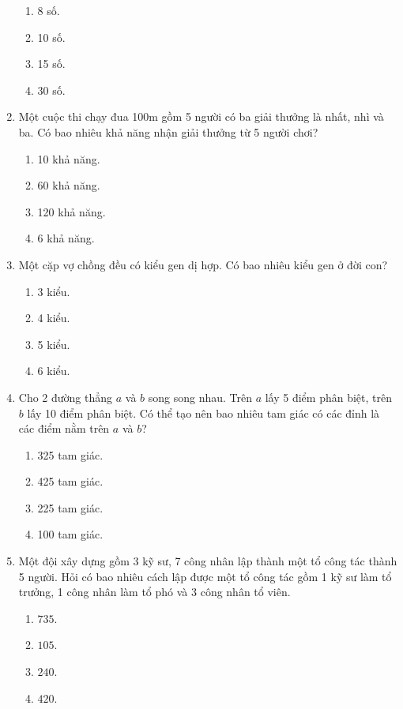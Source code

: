 \begin{enumerate}[label=\textbf{Câu \arabic*.},align=left,left=0cm..0cm,itemindent=*]
\begin{enumerate}[label=\textbf{\Alph*.},align=left,left=1cm..0cm,itemindent=*]
		\item 8 số. \item 10 số. \item 15 số. \item 30 số.
	\end{enumerate}
	\item Một cuộc thi chạy đua 100m gồm 5 người có ba giải thưởng là nhất, nhì và ba. Có bao nhiêu khả năng nhận giải thưởng từ 5 người chơi?
	\begin{enumerate}[label=\textbf{\Alph*.},align=left,left=1cm..0cm,itemindent=*]
		\item 10 khả năng. \item 60 khả năng. \item 120 khả năng. \item 6 khả năng.
	\end{enumerate}
	\item Một cặp vợ chồng đều có kiểu gen dị hợp. Có bao nhiêu kiểu gen ở đời con?
	\begin{enumerate}[label=\textbf{\Alph*.},align=left,left=1cm..0cm,itemindent=*]
		\item 3 kiểu. \item 4 kiểu. \item 5 kiểu. \item 6 kiểu.
	\end{enumerate}
	\item Cho 2 đường thẳng $a$ và $b$ song song nhau. Trên $a$ lấy 5 điểm phân biệt, trên $b$ lấy 10 điểm phân biệt. Có thể tạo nên bao nhiêu tam giác có các đỉnh là các điểm nằm trên $a$ và $b$?
	\begin{enumerate}[label=\textbf{\Alph*.},align=left,left=1cm..0cm,itemindent=*]
	    \item 325 tam giác. \item 425 tam giác. \item 225 tam giác. \item 100 tam giác.
	\end{enumerate}
	\item Một đội xây dựng gồm 3 kỹ sư, 7 công nhân lập thành một tổ công tác thành 5 người. Hỏi có bao nhiêu cách lập được một tổ công tác gồm 1 kỹ sư làm tổ trưởng, 1 công nhân làm tổ phó và 3 công nhân tổ viên.
	\begin{enumerate}[label=\textbf{\Alph*.},align=left,left=1cm..0cm,itemindent=*]
	    \item $735$. \item $105$. \item $240$. \item $420$.

\end{enumerate}
\end{enumerate}
